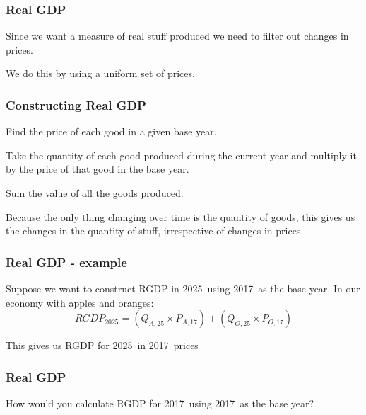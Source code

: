 \documentclass[aspectratio=169]{beamer}
\newenvironment{wideitemize}{\itemize\addtolength{\itemsep}{10pt}}{\enditemize}
\newcommand{\thisyear}{2025}
\newcommand{\baseyear}{2017}
\newcommand{\baseyearshort}{17}
\newcommand{\thisyearshort}{25}
\begin{document}
\begin{frame}
\frametitle{Real GDP}
\begin{wideitemize}
\item Since we want a measure of real stuff produced we need to filter out changes in prices.
\item We do this by using a uniform set of prices.
\end{wideitemize}

\end{frame}


\begin{frame}
\frametitle{Constructing Real GDP}
\begin{wideitemize}
\item Find the price of each good in a given base year.
\item Take the quantity of each good produced during the current year and multiply it by the price of that good in the base year.
\item Sum the value of all the goods produced.
\item Because the only thing changing over time is the quantity of goods, this gives us the changes in the quantity of stuff, irrespective of changes in prices.
\end{wideitemize}
\end{frame}


\begin{frame}
\frametitle{Real GDP - example}
\begin{wideitemize}
\item Suppose we want to construct RGDP in \thisyear \  using \baseyear \ as the base year.  In our economy with apples and oranges:
\begin{equation*}
RGDP_{\thisyear} = (Q_{A,\thisyearshort} \times P_{A,\baseyearshort})+(Q_{O,\thisyearshort} \times P_{O,\baseyearshort})
\end{equation*}
\item This gives us RGDP for \thisyear \  in \baseyear \ prices
\end{wideitemize}

\end{frame}


\begin{frame}
\frametitle{Real GDP}
\begin{wideitemize}
\item How would you calculate RGDP for \baseyear \ using \baseyear \ as the base year?
\end{wideitemize}

\end{frame}
\end{document}

